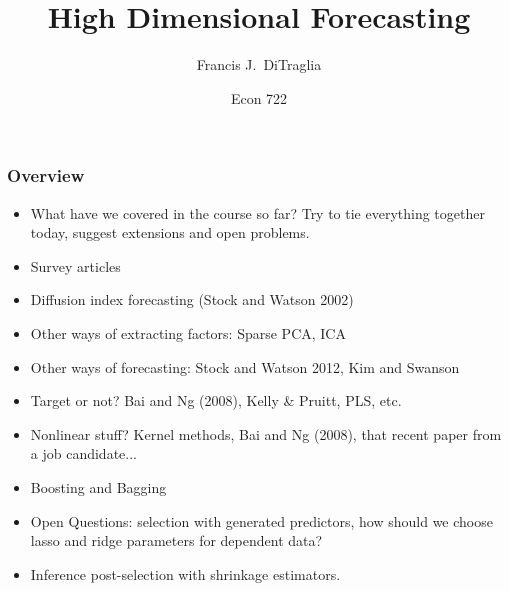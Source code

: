 \documentclass[handout]{beamer}
\title[Econ 722]{High Dimensional Forecasting}
\author[F. DiTraglia]{Francis J.\ DiTraglia}
\institute{University of Pennsylvania}
\date{Econ 722}
\begin{document}
 



\begin{frame}[plain]
	\titlepage 
	

\end{frame} 


\begin{frame}
	\frametitle{Overview}
	\footnotesize
	\begin{itemize}
		\item What have we covered in the course so far? Try to tie everything together today, suggest extensions and open problems.
		\item Survey articles
		\item Diffusion index forecasting (Stock and Watson 2002)
		\item Other ways of extracting factors: Sparse PCA, ICA
		\item Other ways of forecasting: Stock and Watson 2012, Kim and Swanson
		\item Target or not? Bai and Ng (2008), Kelly \& Pruitt, PLS, etc.
		\item Nonlinear stuff? Kernel methods, Bai and Ng (2008), that recent paper from a job candidate...
		\item Boosting and Bagging
		\item Open Questions: selection with generated predictors, how should we choose lasso and ridge parameters for dependent data? 
		\item Inference post-selection with shrinkage estimators.
	\end{itemize}
\end{frame}
\end{document}
